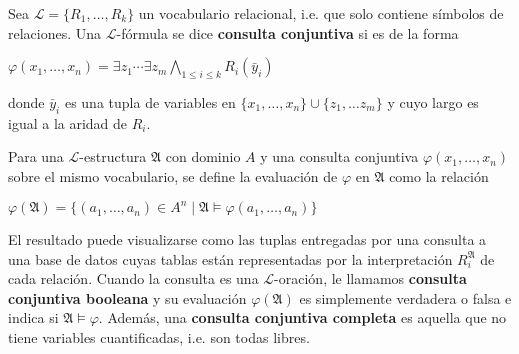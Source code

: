 Sea $\mathcal{L}=\{R_1,\ldots,R_k\}$ un vocabulario relacional, i.e. que solo contiene símbolos de relaciones. Una $\mathcal{L}$-fórmula se dice \textbf{consulta conjuntiva} si es de la forma
\begin{center}
	$\displaystyle{\varphi(x_1,\ldots,x_n)=\exists z_1\cdots \exists z_m\bigwedge_{1\leq i\leq k}R_i(\bar{y}_i)}$
\end{center}
donde $\bar{y}_i$ es una tupla de variables en $\{x_1,\ldots,x_n\}\cup\{z_1,\ldots z_m\}$ y cuyo largo es igual a la aridad de $R_i$.\medskip

Para una $\mathcal{L}$-estructura $\mathfrak{A}$ con dominio $A$ y una consulta conjuntiva $\varphi(x_1,\ldots,x_n)$ sobre el mismo vocabulario, se define la evaluación de $\varphi$ en $\mathfrak{A}$ como la relación
\begin{center}
	$\varphi(\mathfrak{A})=\{(a_1,\ldots,a_n)\in A^n\mid \mathfrak{A}\models\varphi(a_1,\ldots,a_n)\}$
\end{center}
El resultado puede visualizarse como las tuplas entregadas por una consulta a una base de datos cuyas tablas están representadas por la interpretación $R_i^\mathfrak{A}$ de cada relación. Cuando la consulta es una $\mathcal{L}$-oración, le llamamos \textbf{consulta conjuntiva booleana} y su evaluación $\varphi(\mathfrak{A})$ es simplemente verdadera o falsa e indica si $\mathfrak{A}\models\varphi$. Además, una \textbf{consulta conjuntiva completa} es aquella que no tiene variables cuantificadas, i.e. son todas libres.\medskip

